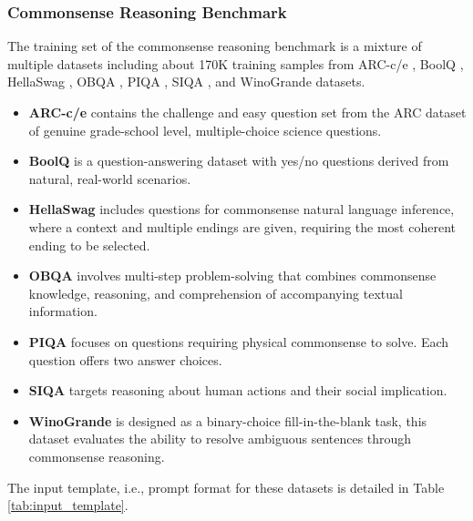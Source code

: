 \documentclass{article} %
\theoremstyle{plain}
\theoremstyle{definition}
\begin{document}
\subsubsection{Commonsense Reasoning Benchmark}
The training set of the commonsense reasoning benchmark is a mixture of multiple datasets including about 170K training samples from ARC-c/e \citep{clark2018think}, BoolQ \citep{clark2019boolq}, HellaSwag \citep{zellers2019hellaswag}, OBQA \citep{mihaylov2018can}, PIQA \citep{bisk2020piqa}, SIQA \citep{sap2019socialiqa}, and WinoGrande \citep{sakaguchi2021winogrande} datasets. 
\begin{itemize}[leftmargin=*]
    \item \textbf{ARC-c/e} contains the challenge and easy question set from the ARC dataset of genuine grade-school level, multiple-choice science questions.
    \item \textbf{BoolQ} is a question-answering dataset with yes/no questions derived from natural, real-world scenarios. 
    \item \textbf{HellaSwag} includes questions for commonsense natural language inference, where a context and multiple endings are given, requiring the most coherent ending to be selected.
    \item \textbf{OBQA} involves multi-step problem-solving that combines commonsense knowledge, reasoning, and comprehension of accompanying textual information.
    \item \textbf{PIQA} focuses on questions requiring physical commonsense to solve. Each question offers two answer choices. 
    \item \textbf{SIQA} targets reasoning about human actions and their social implication. 
    \item \textbf{WinoGrande} is designed as a binary-choice fill-in-the-blank task, this dataset evaluates the ability to resolve ambiguous sentences through commonsense reasoning.
\end{itemize}
The input template, i.e., prompt format for these datasets is detailed in Table \ref{tab:input_template}.
\end{document}
